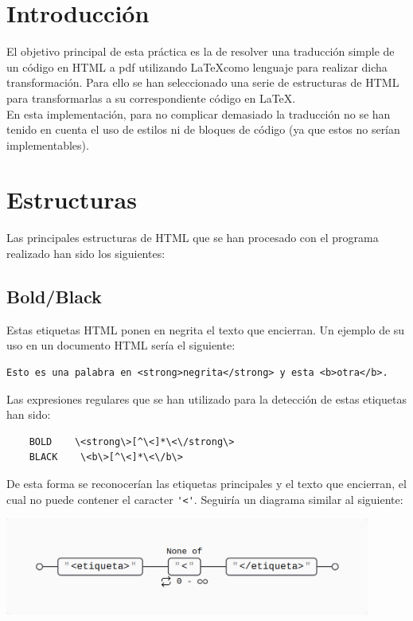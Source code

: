 \documentclass[12pt]{article}
\begin{document}
\portada[%
        titulo=Modelos de Computación,
        subtitulo=Práctica Lex/Flex,
        autor=Jesús Muñoz Velasco\\Daniel Morán Sánchez,
        año=Curso 2024-2025,
        imagen=../../../../documents/_assets/Logo-UGR-Black.png]

\tableofcontents

\newpage

\section{Introducción}

El objetivo principal de esta práctica es la de resolver una traducción simple de un código en HTML a pdf utilizando \LaTeX como lenguaje para realizar dicha transformación. Para ello se han seleccionado una serie de estructuras de HTML para transformarlas a su correspondiente código en \LaTeX.\\

En esta implementación, para no complicar demasiado la traducción no se han tenido en cuenta el uso de estilos ni de bloques de código (ya que estos no serían implementables).

\section{Estructuras}
Las principales estructuras de HTML que se han procesado con el programa realizado han sido los siguientes:

\subsection{Bold/Black}
Estas etiquetas HTML ponen en negrita el texto que encierran. Un ejemplo de su uso en un documento HTML sería el siguiente:
\begin{verbatim}
Esto es una palabra en <strong>negrita</strong> y esta <b>otra</b>.
\end{verbatim}
Las expresiones regulares que se han utilizado para la detección de estas etiquetas han sido:
\begin{verbatim}
    BOLD    \<strong\>[^\<]*\<\/strong\>
    BLACK    \<b\>[^\<]*\<\/b\>
\end{verbatim}
De esta forma se reconocerían las etiquetas principales y el texto que encierran, el cual no puede contener el caracter \verb|'<'|. Seguiría un diagrama similar al siguiente:

\begin{center}\includegraphics[width=12cm]{./images/image1.png}\end{center}
\end{document}
